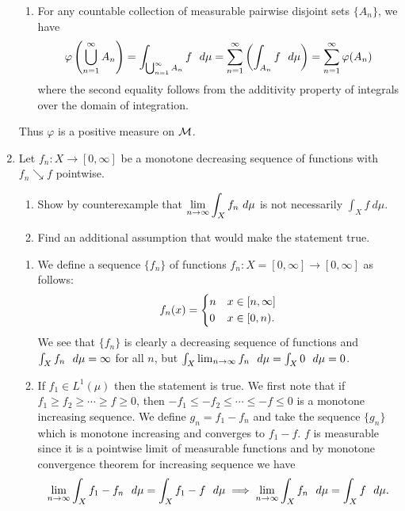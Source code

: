 \documentclass[12pt]{article}
\begin{document}
\begin{enumerate}
\begin{mybox}
\begin{enumerate}
            \item For any countable collection of measurable pairwise
            disjoint sets $\{A_n\}$, we have
            $$\varphi\left(\bigcup_{n=1}^\infty{A_n}\right)=
            \int_{\bigcup_{n=1}^\infty{A_n}}{f\ \dmu}=\sum_{n=1}^\infty
            {\left(\int_{A_n}{f\ \dmu}\right)}=\sum_{n=1}^\infty{\varphi(A_n)}$$
            where the second equality follows from the additivity property
            of integrals over the domain of integration.
        \end{enumerate}
        Thus $\varphi$ is a positive measure on $\mathcal{M}$.
    \end{mybox}
    
    \item Let $f_n: X \to [0, \infty]$ be a monotone decreasing sequence of  functions with $f_n \searrow f$ pointwise. 
    \begin{enumerate}
    \item Show by counterexample that $\displaystyle \lim_{n \to \infty}\int_X f_n\ d \mu$ is not necessarily $\int_X f \ d\mu$. 
    \item Find an additional assumption that would make the statement true. 
    \end{enumerate}
    
    \begin{mybox}
        \begin{enumerate}
            \item We define a sequence $\{f_n\}$ of functions
            $f_n:X=[0,\infty]\to[0,\infty]$ as follows:
            $$f_n(x)=
            \begin{dcases}
                n &x\in [n,\infty]\\
                0 &x\in[0,n).
            \end{dcases}$$
            We see that $\{f_n\}$ is clearly a decreasing sequence of
            functions and $\int_{X}{f_n\ \ d\mu}=\infty$ for all $n$, but
            $\int_X{\lim_{n\to\infty}{f_n}\ \dmu}=\int_X{0\ \dmu}=0$.
            
            \vspace*{2mm}
            \item If $f_1\in L^1(\mu)$ then the statement is true. We first
            note that if $f_1\geq f_2\geq\cdots \geq f\geq 0$, then
            $-f_1\leq-f_2\leq\cdots \leq -f\leq 0$ is a monotone increasing
            sequence. We define $g_n=f_1-f_n$ and take the sequence
            $\{g_n\}$ which is monotone increasing and converges to $f_1-f$. $f$ is
            measurable since it is a pointwise limit of measurable
            functions and by monotone convergence theorem for increasing
            sequence we have
            $$\lim_{n\to\infty}{\int_X{f_1-f_n\ \dmu}}=\int_X{f_1-f\ \dmu}
            \implies
            \lim_{n\to\infty}{\int_X{f_n\ \dmu}}=\int_X{f\ \dmu}.$$
        \end{enumerate}
    \end{mybox}
    

\end{enumerate}
\end{document}
